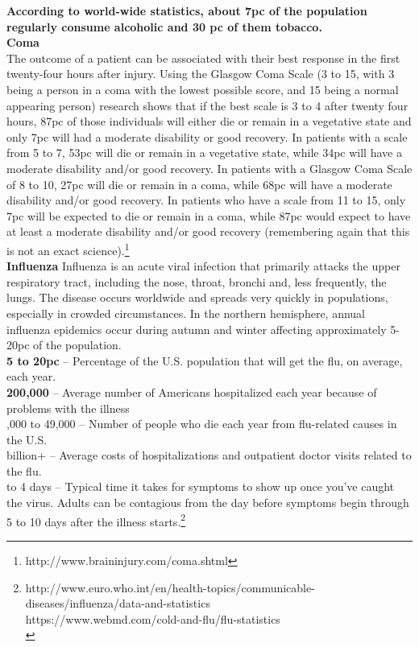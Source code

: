 \textbf{According to world-wide statistics, about 7pc of the population regularly consume alcoholic and 30 pc of them tobacco.}\\

\textbf{Coma}\\
\tab The outcome of a patient can be associated with their best response in the first twenty-four hours after injury. Using the Glasgow Coma Scale (3 to 15, with 3 being a person in a coma with the lowest possible score, and 15 being a normal appearing person) research shows that if the best scale is 3 to 4 after twenty four hours, 87pc of those individuals will either die or remain in a vegetative state and only 7pc  will had a moderate disability or good recovery. In patients with a scale from 5 to 7, 53pc  will die or remain in a vegetative state, while 34pc  will have a moderate disability and/or good recovery. In patients with a Glasgow Coma Scale of 8 to 10, 27pc  will die or remain in a coma, while 68pc  will have a moderate disability and/or good recovery. In patients who have a scale from 11 to 15, only 7pc  will be expected to die or remain in a coma, while 87pc  would expect to have at least a moderate disability and/or good recovery (remembering again that this is not an exact science).\footnote{http://www.braininjury.com/coma.shtml}\\

\textbf{Influenza}
\tab Influenza is an acute viral infection that primarily attacks the upper respiratory tract, including the nose, throat, bronchi and, less frequently, the lungs. The disease occurs worldwide and spreads very quickly in populations, especially in crowded circumstances. In the northern hemisphere, annual influenza epidemics occur during autumn and winter affecting approximately 5-20pc of the population.\\

\tab \textbf{5 to 20pc} -- Percentage of the U.S. population that will get the flu, on average, each year.\\
\tab \textbf{200,000} -- Average number of Americans hospitalized each year because of problems with the illness\\
,000 to 49,000 -- Number of people who die each year from flu-related causes in the U.S.\\
 billion+ -- Average costs of hospitalizations and outpatient doctor visits related to the flu.\\
 to 4 days -- Typical time it takes for symptoms to show up once you've caught the virus. Adults can be contagious from the day before symptoms begin through 5 to 10 days after the illness starts.\footnote{http://www.euro.who.int/en/health-topics/communicable-diseases/influenza/data-and-statistics\\
https://www.webmd.com/cold-and-flu/flu-statistics\\
}\\

